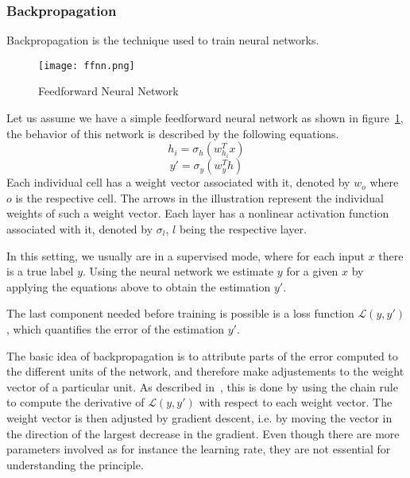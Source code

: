 \subsubsection{Backpropagation}
Backpropagation is the technique used to train neural networks.
\begin{figure}[t]
	\centering
	\captionsetup{width=0.8\textwidth}
    \texttt{[image: ffnn.png]}
    \caption{Feedforward Neural Network}
    \label{fig:ffnn}
\end{figure}
Let us assume we have a simple feedforward neural network as shown in figure~\ref{fig:ffnn}, the behavior of this network is described by the following equations.
\begin{equation}\label{eq:ffnn_hidden_layer}
    h_i = \sigma_h(w_{h_i}^Tx)
\end{equation}
\begin{equation}\label{eq:ffnn_output}
    y' = \sigma_y(w_{y}^Th)
\end{equation}
Each individual cell has a weight vector associated with it, denoted by $w_o$ where $o$ is the respective cell.
The arrows in the illustration represent the individual weights of such a weight vector.
Each layer has a nonlinear activation function associated with it, denoted by $\sigma_l$, $l$ being the respective layer.
\par
In this setting, we usually are in a supervised mode, where for each input $x$ there is a true label $y$.
Using the neural network we estimate $y$ for a given $x$ by applying the equations above to obtain the estimation $y'$.
\par
The last component needed before training is possible is a loss function $\mathcal{L}(y, y')$, which quantifies the error of the estimation $y'$.
\par
The basic idea of backpropagation is to attribute parts of the error computed to the different units of the network, and therefore make adjustements to the weight vector of a particular unit.
As described in~\cite{rnn_survey}, this is done by using the chain rule to compute the derivative of $\mathcal{L}(y, y')$ with respect to each weight vector.
The weight vector is then adjusted by gradient descent, i.e. by moving the vector in the direction of the largest decrease in the gradient.
Even though there are more parameters involved as for instance the learning rate, they are not essential for understanding the principle.

